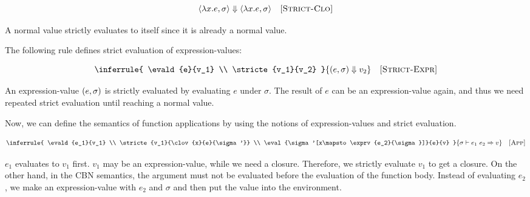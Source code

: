 \vspace{-1em}


\vspace{-1em}

\[
  \langle\lambda x.e,\sigma\rangle\Downarrow\langle\lambda x.e,\sigma\rangle
  \quad\textsc{[Strict-Clo]}
\]

A normal value strictly evaluates to itself since it is already a normal value.

The following rule defines strict evaluation of expression-values:


\vspace{-1em}

\[
  \inferrule
  { \evald{e}{v_1} \\ \stricte{v_1}{v_2} }
  { \stricte{\exprv{e}{\sigma}}{v_2} }
  \quad\textsc{[Strict-Expr]}
\]

An expression-value $(e,\sigma)$ is strictly evaluated by evaluating $e$
under $\sigma$. The result of $e$ can be an expression-value again, and thus we
need repeated strict evaluation until reaching a normal value.

Now, we can define the semantics of function applications by using the notions of
expression-values and strict evaluation.


\vspace{-1em}

\[
  \inferrule
  {
    \evald{e_1}{v_1} \\
    \stricte{v_1}{\clov{x}{e}{\sigma'}} \\
    \eval{\sigma'[x\mapsto\exprv{e_2}{\sigma}]}{e}{v}
  }
  { \evald{\eapp{e_1}{e_2}}{v} }
  \quad\textsc{[App]}
\]

$e_1$ evaluates to $v_1$ first. $v_1$ may be an expression-value, while we need a
closure. Therefore, we strictly evaluate $v_1$ to get a closure. On the other
hand, in the CBN semantics, the argument must not be evaluated before the
evaluation of the function body. Instead of
evaluating $e_2$, we make an expression-value with $e_2$ and $\sigma$ and then
put the value into the environment.

